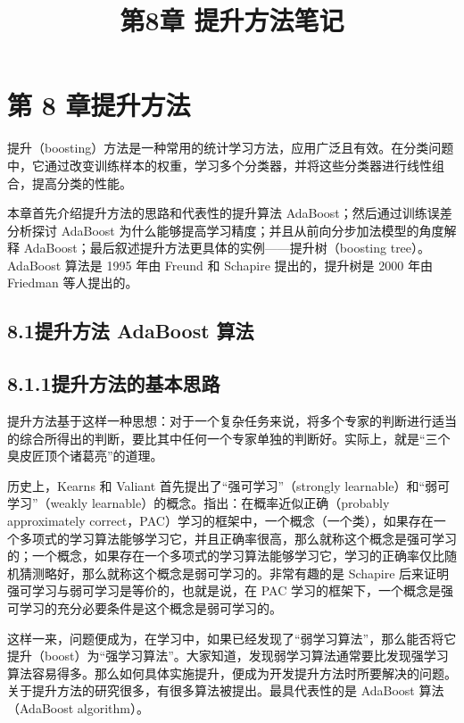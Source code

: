 \documentclass[UTF8,12pt,a4paper,fontset=fandol]{ctexart}
\title{第8章 提升方法笔记}
\author{}
\date{}
\begin{document}
\maketitle

\section*{第 8 章\quad 提升方法}

提升（boosting）方法是一种常用的统计学习方法，应用广泛且有效。在分类问题中，它通过改变训练样本的权重，学习多个分类器，并将这些分类器进行线性组合，提高分类的性能。

本章首先介绍提升方法的思路和代表性的提升算法 AdaBoost；然后通过训练误差分析探讨 AdaBoost 为什么能够提高学习精度；并且从前向分步加法模型的角度解释 AdaBoost；最后叙述提升方法更具体的实例——提升树（boosting tree）。AdaBoost 算法是 1995 年由 Freund 和 Schapire 提出的，提升树是 2000 年由 Friedman 等人提出的。

\subsection*{8.1\quad 提升方法 AdaBoost 算法}

\subsection*{8.1.1\quad 提升方法的基本思路}

提升方法基于这样一种思想：对于一个复杂任务来说，将多个专家的判断进行适当的综合所得出的判断，要比其中任何一个专家单独的判断好。实际上，就是“三个臭皮匠顶个诸葛亮”的道理。

历史上，Kearns 和 Valiant 首先提出了“强可学习”（strongly learnable）和“弱可学习”（weakly learnable）的概念。指出：在概率近似正确（probably approximately correct，PAC）学习的框架中，一个概念（一个类），如果存在一个多项式的学习算法能够学习它，并且正确率很高，那么就称这个概念是强可学习的；一个概念，如果存在一个多项式的学习算法能够学习它，学习的正确率仅比随机猜测略好，那么就称这个概念是弱可学习的。非常有趣的是 Schapire 后来证明强可学习与弱可学习是等价的，也就是说，在 PAC 学习的框架下，一个概念是强可学习的充分必要条件是这个概念是弱可学习的。

这样一来，问题便成为，在学习中，如果已经发现了“弱学习算法”，那么能否将它提升（boost）为“强学习算法”。大家知道，发现弱学习算法通常要比发现强学习算法容易得多。那么如何具体实施提升，便成为开发提升方法时所要解决的问题。关于提升方法的研究很多，有很多算法被提出。最具代表性的是 AdaBoost 算法（AdaBoost algorithm）。
\end{document}

